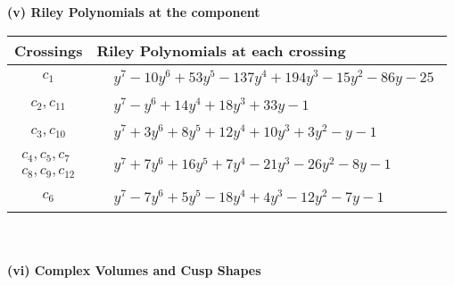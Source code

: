 \documentclass[1p]{elsarticle_modified}
\theoremstyle{definition}
\begin{document}
\newpage\renewcommand{\arraystretch}{1}
\flushleft \textbf{(v) Riley Polynomials at the component}\newline \\
\begin{tabular}{m{50pt}|m{274pt}}
Crossings & \hspace{64pt}Riley Polynomials at each crossing \\
\hline $$\begin{aligned}c_{1}\end{aligned}$$&$\begin{aligned}
&y^7-10 y^6+53 y^5-137 y^4+194 y^3-15 y^2-86 y-25
\end{aligned}$\\
\hline $$\begin{aligned}c_{2},c_{11}\end{aligned}$$&$\begin{aligned}
&y^7- y^6+14 y^4+18 y^3+33 y-1
\end{aligned}$\\
\hline $$\begin{aligned}c_{3},c_{10}\end{aligned}$$&$\begin{aligned}
&y^7+3 y^6+8 y^5+12 y^4+10 y^3+3 y^2- y-1
\end{aligned}$\\
\hline $$\begin{aligned}c_{4},c_{5},c_{7}\\c_{8},c_{9},c_{12}\end{aligned}$$&$\begin{aligned}
&y^7+7 y^6+16 y^5+7 y^4-21 y^3-26 y^2-8 y-1
\end{aligned}$\\
\hline $$\begin{aligned}c_{6}\end{aligned}$$&$\begin{aligned}
&y^7-7 y^6+5 y^5-18 y^4+4 y^3-12 y^2-7 y-1
\end{aligned}$\\
\hline
\end{tabular}\\~\\
\newpage\flushleft \textbf{(vi) Complex Volumes and Cusp Shapes}
\end{document}
